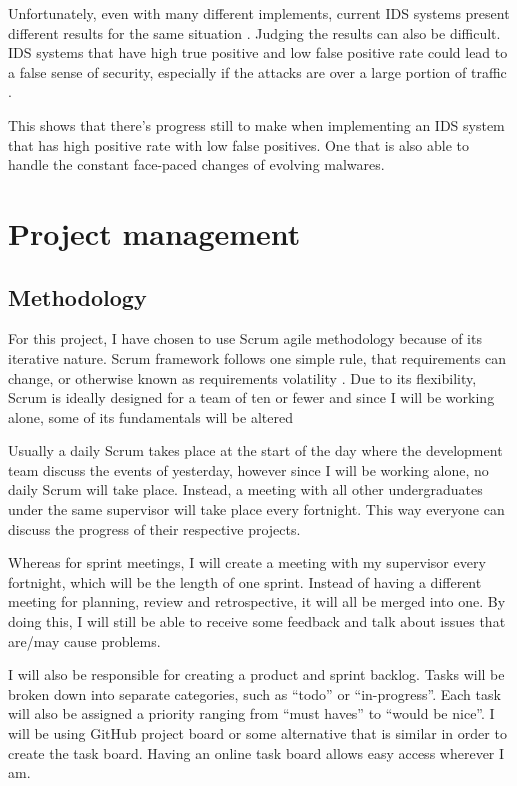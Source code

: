 \documentclass[11pt]{article}
\begin{document}
Unfortunately, even with many different implements, current IDS systems present different results for the same situation \cite{related-work-advantages-and-disadvantages}. Judging the results can also be difficult. IDS systems that have high true positive and low false positive rate could lead to a false sense of security, especially if the attacks are over a large portion of traffic \cite{related-work-advantages-and-disadvantages}.

This shows that there’s progress still to make when implementing an IDS system that has high positive rate with low false positives. One that is also able to handle the constant face-paced changes of evolving malwares.

\newpage
\section{Project management}
\subsection{Methodology}
For this project, I have chosen to use Scrum agile methodology because of its iterative nature. Scrum framework follows one simple rule, that requirements can change, or otherwise known as requirements volatility \cite{methodology-requirement-volatile}. Due to its flexibility, Scrum is ideally designed for a team of ten or fewer \cite{methodology-ten-fewer} and since I will be working alone, some of its fundamentals will be altered

Usually a daily Scrum takes place at the start of the day where the development team discuss the events of yesterday, however since I will be working alone, no daily Scrum will take place. Instead, a meeting with all other undergraduates under the same supervisor will take place every fortnight. This way everyone can discuss the progress of their respective projects.

Whereas for sprint meetings, I will create a meeting with my supervisor every fortnight, which will be the length of one sprint. Instead of having a different meeting for planning, review and retrospective, it will all be merged into one. By doing this, I will still be able to receive some feedback and talk about issues that are/may cause problems.

I will also be responsible for creating a product and sprint backlog. Tasks will be broken down into separate categories, such as “todo” or “in-progress”. Each task will also be assigned a priority ranging from “must haves” to “would be nice”. I will be using GitHub project board \cite{methodology-github-projects} or some alternative that is similar in order to create the task board. Having an online task board allows easy access wherever I am. 
\end{document}
